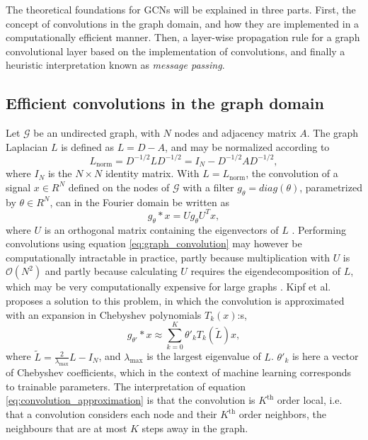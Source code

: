 The theoretical foundations for GCNs will be explained in three parts. First, the concept of convolutions in the graph domain, and how they are implemented in a computationally efficient manner. Then, a layer-wise propagation rule for a graph convolutional layer based on the implementation of convolutions, and finally a heuristic interpretation known as \textit{message passing}.

\subsection{Efficient convolutions in the graph domain}

Let $\mathcal{G}$ be an undirected graph, with $N$ nodes and adjacency matrix $A$. The graph Laplacian $L$ is defined as $L=D-A$, and may be normalized according to
\begin{equation}
    L_\text{norm} = D^{-1/2} L D^{-1/2} =  I_N - D^{-1/2} A D^{-1/2},
    \label{eq:normalized_graph_laplacian}
\end{equation}
where $I_N$ is the $N \times N$ identity matrix. With $L = L_{\text{norm}}$, the convolution of a signal $x \in R^N$ defined on the nodes of $\mathcal{G}$ with a filter $g_\theta = diag(\theta)$, parametrized by $\theta \in R^N$, can in the Fourier domain be written as
\begin{equation}
    g_\theta * x = U g_\theta U^T x,
    \label{eq:graph_convolution}
\end{equation}
where $U$ is an orthogonal matrix containing the eigenvectors of $L$ \cite{kipf_semi_supervised}. Performing convolutions using equation \ref{eq:graph_convolution} may however be computationally intractable in practice, partly because multiplication with $U$ is $\mathcal{O}(N^2)$ and partly because calculating $U$ requires the eigendecomposition of $L$, which may be very computationally expensive for large graphs \cite{kipf_semi_supervised}. Kipf et al. \cite{kipf_semi_supervised} proposes a solution to this problem, in which the convolution is approximated with an expansion in Chebyshev polynomials $T_k(x)$:s,
\begin{equation}
    g_{\theta'} * x \approx \sum_{k=0}^K \theta'_k T_k(\tilde{L})x,
    \label{eq:convolution_approximation}
\end{equation}
where $\tilde{L} =  \frac{2}{\lambda_{\text{max}}}L - I_N$, and $\lambda_{\text{max}}$ is the largest eigenvalue of $L$. $\theta'_k$ is here a vector of Chebyshev coefficients, which in the context of machine learning corresponds to trainable parameters. The interpretation of equation \eqref{eq:convolution_approximation} is that the convolution is $K^{\text{th}}$ order local, i.e. that a convolution considers each node and their $K^{\text{th}}$ order neighbors, the neighbours that are at most $K$ steps away in the graph. 

